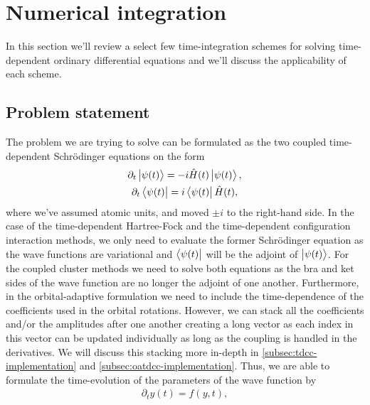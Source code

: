     \section{Numerical integration}
        \label{sec:numerical-integration}
        In this section we'll review a select few time-integration schemes for
        solving time-dependent ordinary differential equations and we'll discuss the
        applicability of each scheme.

        \subsection{Problem statement}
            The problem we are trying to solve can be formulated as the
            two coupled time-dependent Schrödinger equations on the form
            \begin{gather}
                \partial_t\ket{\psi(t)}
                = -i\hat{H}(t)\ket{\psi(t)},
                \\
                \partial_t\bra{\psi(t)}
                = i\bra{\psi(t)}\hat{H}(t),
            \end{gather}
            where we've assumed atomic units, and moved $\pm i$ to the right-hand
            side.
            In the case of the time-dependent Hartree-Fock and the
            time-dependent configuration interaction methods, we only need to
            evaluate the former Schrödinger equation as the wave functions are
            variational and $\bra{\psi(t)}$ will be the adjoint of
            $\ket{\psi(t)}$.
            For the coupled cluster methods we need to solve both equations as
            the bra and ket sides of the wave function are no longer the adjoint
            of one another.
            Furthermore, in the orbital-adaptive formulation we need to include
            the time-dependence of the coefficients used in the orbital
            rotations.
            However, we can stack all the coefficients and/or the amplitudes
            after one another creating a long vector as each index in this
            vector can be updated individually as long as the coupling is
            handled in the derivatives.
            We will discuss this stacking more in-depth in
            \autoref{subsec:tdcc-implementation} and
            \autoref{subsec:oatdcc-implementation}.
            Thus, we are able to formulate the time-evolution of the
            parameters of the wave function by
            \begin{align}
                \partial_t y(t) = f(y, t),
            \end{align}
